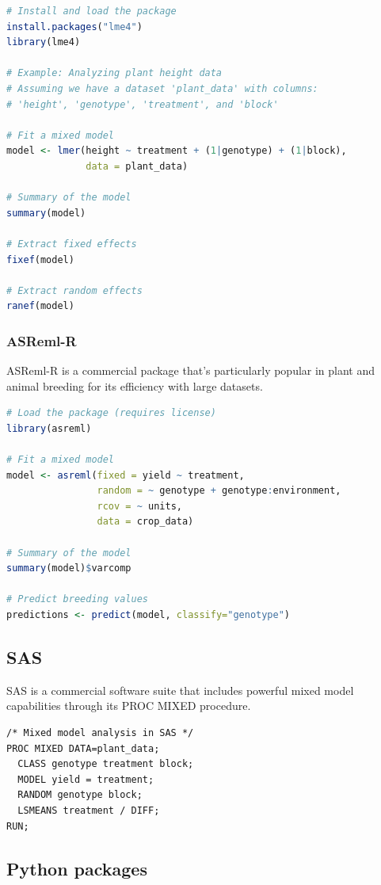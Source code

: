 \documentclass[12pt,a4paper]{article}
\begin{document}
\begin{lstlisting}[language=R]
# Install and load the package
install.packages("lme4")
library(lme4)

# Example: Analyzing plant height data
# Assuming we have a dataset 'plant_data' with columns:
# 'height', 'genotype', 'treatment', and 'block'

# Fit a mixed model
model <- lmer(height ~ treatment + (1|genotype) + (1|block), 
              data = plant_data)

# Summary of the model
summary(model)

# Extract fixed effects
fixef(model)

# Extract random effects
ranef(model)
\end{lstlisting}

\subsubsection{ASReml-R}

ASReml-R is a commercial package that's particularly popular in plant and animal breeding for its efficiency with large datasets.

\begin{lstlisting}[language=R]
# Load the package (requires license)
library(asreml)

# Fit a mixed model
model <- asreml(fixed = yield ~ treatment,
                random = ~ genotype + genotype:environment,
                rcov = ~ units,
                data = crop_data)

# Summary of the model
summary(model)$varcomp

# Predict breeding values
predictions <- predict(model, classify="genotype")
\end{lstlisting}

\subsection{SAS}

SAS is a commercial software suite that includes powerful mixed model capabilities through its PROC MIXED procedure.

\begin{lstlisting}[language=SAS]
/* Mixed model analysis in SAS */
PROC MIXED DATA=plant_data;
  CLASS genotype treatment block;
  MODEL yield = treatment;
  RANDOM genotype block;
  LSMEANS treatment / DIFF;
RUN;
\end{lstlisting}

\subsection{Python packages}
\end{document}
